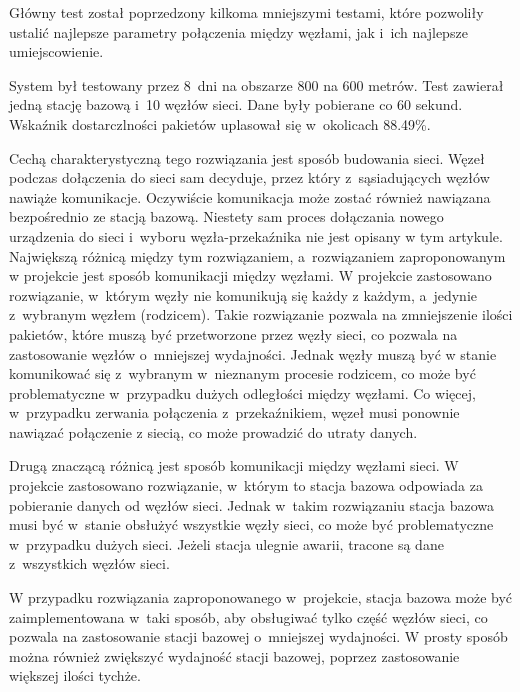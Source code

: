 Główny test został poprzedzony kilkoma mniejszymi testami, które pozwoliły ustalić najlepsze parametry połączenia między węzłami, jak i~ich najlepsze umiejscowienie.

System był testowany przez 8~dni na obszarze 800 na 600 metrów.
Test zawierał jedną stację bazową i~10 węzłów sieci.
Dane były pobierane co 60 sekund.
Wskaźnik dostarczlności pakietów uplasował się w~okolicach 88.49\%.

Cechą charakterystyczną tego rozwiązania jest sposób budowania sieci.
Węzeł podczas dołączenia do sieci sam decyduje, przez który z~sąsiadujących węzłów nawiąże komunikacje.
Oczywiście komunikacja może zostać również nawiązana bezpośrednio ze stacją bazową.
Niestety sam proces dołączania nowego urządzenia do sieci i~wyboru węzła-przekaźnika nie jest opisany w tym artykule.
Największą różnicą między tym rozwiązaniem, a~rozwiązaniem zaproponowanym w projekcie jest sposób komunikacji między węzłami.
W projekcie zastosowano rozwiązanie, w~którym węzły nie komunikują się każdy z każdym, a~jedynie z~wybranym węzłem (rodzicem).
Takie rozwiązanie pozwala na zmniejszenie ilości pakietów, które muszą być przetworzone przez węzły sieci, co pozwala na zastosowanie węzłów o~mniejszej wydajności.
Jednak węzły muszą być w stanie komunikować się z~wybranym w~nieznanym procesie rodzicem, co może być problematyczne w~przypadku dużych odległości między węzłami.
Co więcej, w~przypadku zerwania połączenia z~przekaźnikiem, węzeł musi ponownie nawiązać połączenie z siecią, co może prowadzić do utraty danych.

Drugą znaczącą różnicą jest sposób komunikacji między węzłami sieci.
W projekcie zastosowano rozwiązanie, w~którym to stacja bazowa odpowiada za pobieranie danych od węzłów sieci.
Jednak w~takim rozwiązaniu stacja bazowa musi być w~stanie obsłużyć wszystkie węzły sieci, co może być problematyczne w~przypadku dużych sieci.
Jeżeli stacja ulegnie awarii, tracone są dane z~wszystkich węzłów sieci.

W przypadku rozwiązania zaproponowanego w~projekcie, stacja bazowa może być zaimplementowana w~taki sposób, aby obsługiwać tylko część węzłów sieci, co pozwala na zastosowanie stacji bazowej o~mniejszej wydajności.
W prosty sposób można również zwiększyć wydajność stacji bazowej, poprzez zastosowanie większej ilości tychże.

